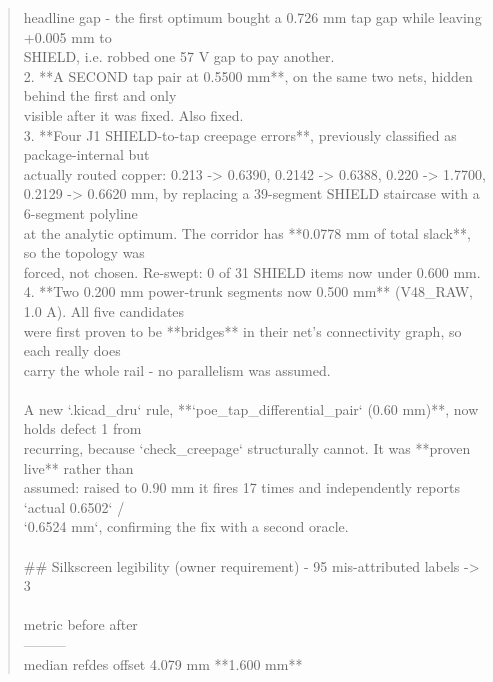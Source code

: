 \documentclass[11pt,a4paper]{article}
\begin{document}
\begin{quote}
   headline gap - the first optimum bought a 0.726 mm tap gap while leaving +0.005 mm to\\
   SHIELD, i.e. robbed one 57 V gap to pay another.\\
2. {*}{*}A SECOND tap pair at 0.5500 mm{*}{*}, on the same two nets, hidden behind the first and only\\
   visible after it was fixed. Also fixed.\\
3. {*}{*}Four J1 SHIELD-to-tap creepage errors{*}{*}, previously classified as package-internal but\\
   actually routed copper: 0.213 -\textgreater{} 0.6390, 0.2142 -\textgreater{} 0.6388, 0.220 -\textgreater{} 1.7700,\\
   0.2129 -\textgreater{} 0.6620 mm, by replacing a 39-segment SHIELD staircase with a 6-segment polyline\\
   at the analytic optimum. The corridor has {*}{*}0.0778 mm of total slack{*}{*}, so the topology was\\
   forced, not chosen. Re-swept: 0 of 31 SHIELD items now under 0.600 mm.\\
4. {*}{*}Two 0.200 mm power-trunk segments now 0.500 mm{*}{*} (V48\_RAW, 1.0 A). All five candidates\\
   were first proven to be {*}{*}bridges{*}{*} in their net's connectivity graph, so each really does\\
   carry the whole rail - no parallelism was assumed.\\
~\\
A new `.kicad\_dru` rule, {*}{*}`poe\_tap\_differential\_pair` (0.60 mm){*}{*}, now holds defect 1 from\\
recurring, because `check\_creepage` structurally cannot. It was {*}{*}proven live{*}{*} rather than\\
assumed: raised to 0.90 mm it fires 17 times and independently reports `actual 0.6502` /\\
`0.6524 mm`, confirming the fix with a second oracle.\\
~\\
\#\# Silkscreen legibility (owner requirement) - 95 mis-attributed labels -\textgreater{} 3\\
~\\
\textbar{} metric \textbar{} before \textbar{} after \textbar{}\\
\textbar{}---\textbar{}---\textbar{}---\textbar{}\\
\textbar{} median refdes offset \textbar{} 4.079 mm \textbar{} {*}{*}1.600 mm{*}{*} \textbar{}\\

\end{quote}
\end{document}
